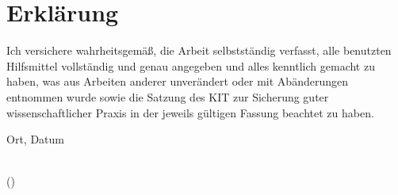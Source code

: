 
\section*{Erkl\"arung}
\vspace{0.35cm}

Ich versichere wahrheitsgem\"aß, die Arbeit selbstst\"andig verfasst, alle benutzten Hilfsmittel vollst\"andig und genau angegeben und alles kenntlich gemacht zu haben, was aus Arbeiten anderer unver\"andert oder mit Ab\"anderungen entnommen wurde sowie die Satzung des KIT zur Sicherung guter wissenschaftlicher Praxis in der jeweils g\"ultigen Fassung beachtet zu haben. 
\newline

Ort, Datum

\vspace{1.5cm}
 
\dotfill\hspace*{8.0cm}\\
\hspace*{2cm}(\theauthor) 
\clearpage

